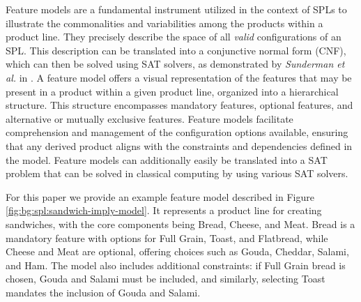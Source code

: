 Feature models are a fundamental instrument utilized in the context of SPLs to illustrate the commonalities and variabilities among the products within a product line.
They precisely describe the space of all \textit{valid} configurations of an SPL.
This description can be translated into a conjunctive normal form (CNF), which can then be solved using SAT solvers, as demonstrated by \textit{Sunderman et al.} in \cite{sunderman-spl-sat}.
A feature model offers a visual representation of the features that may be present in a product within a given product line, organized into a hierarchical structure.
This structure encompasses mandatory features, optional features, and alternative or mutually exclusive features.
Feature models facilitate comprehension and management of the configuration options available, ensuring that any derived product aligns with the constraints and dependencies defined in the model.
Feature models can additionally easily be translated into a SAT problem that can be solved in classical computing by using various SAT solvers. 

For this paper we provide an example feature model described in Figure \ref{fig:bg:spl:sandwich-imply-model}. 
It represents a product line for creating sandwiches, with the core components being Bread, Cheese, and Meat.
Bread is a mandatory feature with options for Full Grain, Toast, and Flatbread, while Cheese and Meat are optional, offering choices such as Gouda, Cheddar, Salami, and Ham.
The model also includes additional constraints: if Full Grain bread is chosen, Gouda and Salami must be included, and similarly, selecting Toast mandates the inclusion of Gouda and Salami.


